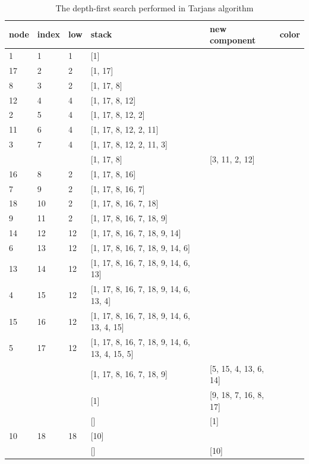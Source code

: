 \documentclass{l4proj}
\begin{document}
\begin{table}[H]
\centering
\begin{tabular}{|l|l|l|l|l|l|}
\hline
node & index & low & stack & new component & color \\
\hline
1& 1 & 1 & [1] & & \cellcolor{babyblue} \\
\hline
17& 2 & 2 & [1, 17] & & \cellcolor{yellow} \\
\hline
8& 3 & 2 & [1, 17, 8] & & \cellcolor{yellow} \\
\hline
12& 4 & 4 & [1, 17, 8, 12] & & \cellcolor{amber} \\
\hline
2& 5 & 4 & [1, 17, 8, 12, 2] & & \cellcolor{amber} \\
\hline
11& 6 & 4 & [1, 17, 8, 12, 2, 11] & & \cellcolor{amber} \\
\hline
3& 7 & 4 & [1, 17, 8, 12, 2, 11, 3] & & \cellcolor{amber} \\
\hline
& & & [1, 17, 8] & [3, 11, 2, 12] & \\
\hline
16& 8 & 2 & [1, 17, 8, 16] & & \cellcolor{yellow} \\
\hline
7& 9 & 2 & [1, 17, 8, 16, 7] & & \cellcolor{yellow} \\
\hline
18& 10 & 2 & [1, 17, 8, 16, 7, 18] & & \cellcolor{yellow} \\
\hline
9& 11 & 2 & [1, 17, 8, 16, 7, 18, 9] & & \cellcolor{yellow} \\
\hline
14& 12 & 12 & [1, 17, 8, 16, 7, 18, 9, 14] & & \cellcolor{applegreen} \\
\hline
6& 13 & 12 & [1, 17, 8, 16, 7, 18, 9, 14, 6] & & \cellcolor{applegreen} \\
\hline
13& 14 & 12 & [1, 17, 8, 16, 7, 18, 9, 14, 6, 13] & & \cellcolor{applegreen} \\
\hline
4& 15 & 12 & [1, 17, 8, 16, 7, 18, 9, 14, 6, 13, 4] & & \cellcolor{applegreen} \\
\hline
15& 16 & 12 & [1, 17, 8, 16, 7, 18, 9, 14, 6, 13, 4, 15] & & \cellcolor{applegreen} \\
\hline
5& 17 & 12 & [1, 17, 8, 16, 7, 18, 9, 14, 6, 13, 4, 15, 5] & & \cellcolor{applegreen} \\
\hline
& & & [1, 17, 8, 16, 7, 18, 9] & [5, 15, 4, 13, 6, 14] & \\
\hline
& & & [1] & [9, 18, 7, 16, 8, 17] & \\
\hline
& & & [] & [1] & \\
\hline
10& 18 & 18 & [10] & & \cellcolor{americanrose} \\
\hline
& & & [] & [10] & \\
\hline
\end{tabular}
\caption{The depth-first search performed in Tarjan\textquotesingle s algorithm \cite{tarjan1972depth}}
\label{tarjantable}
\end{table}
\end{document}
